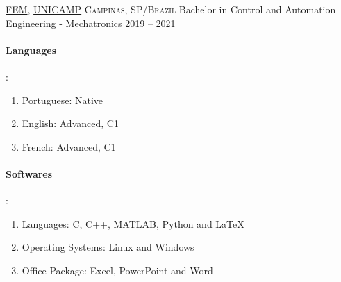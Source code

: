 \documentclass[10pt, a4paper]{article}
\begin{document}
\headedsection
    {\href{https://www.fem.unicamp.br/index.php/pt-br/}{FEM}, \href{https://www.unicamp.br/unicamp/universidade}{UNICAMP}}
    {\textsc{Campinas, SP/Brazil}}
    {
    \headedsubsection
        {Bachelor in Control and Automation Engineering - Mechatronics}
        {2019 -- 2021}
        {\bodytext{}}
    }

\spacedhrule{0.5em}{-0.4em}



\begin{multicols}{2}
    \paragraph{Languages}:
    \begin{enumerate}
        \item Portuguese: Native
        \item English: Advanced, C1
        \item French: Advanced, C1
    \end{enumerate}
    \columnbreak
    \paragraph{Softwares}:
    \begin{enumerate}
        \item Languages: C, C++, MATLAB, Python and LaTeX
        \item Operating Systems: Linux and Windows
        \item Office Package: Excel, PowerPoint and Word
    \end{enumerate}
\end{multicols}

\spacedhrule{1.6em}{-0.4em}
\end{document}
